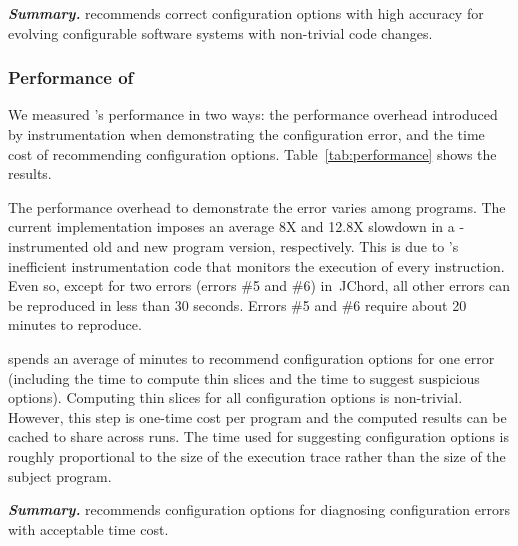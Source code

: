 


\vspace{1mm}

\noindent \textbf{\textit{Summary.}} \ourtool
recommends correct configuration options with
high accuracy for evolving configurable software systems
with non-trivial code changes.

\subsubsection{Performance of \ourtool}
\label{sec:timecost}

We measured \ourtool's performance in two ways:
the performance overhead introduced by instrumentation
when demonstrating the configuration error,
and the time cost of recommending configuration options.
Table~\ref{tab:performance} shows the results.

The performance overhead to demonstrate the error
varies among programs. The current implementation
imposes an average 8X and 12.8X slowdown in a
\ourtool-instrumented old and new program version, respectively.
This is due to \ourtool's inefficient instrumentation code that
monitors the execution of every instruction.
Even so, except for two errors (errors \#5 and \#6) in\
JChord,  all other errors can
be reproduced in less than 30 seconds. Errors \#5 and \#6
require about 20 minutes to reproduce.



\ourtool spends an average of \avgtime minutes
to recommend configuration options for one
error (including the time to compute thin slices
and the time to suggest suspicious options). 
Computing thin slices for all configuration options
is non-trivial. However, this step is one-time cost
per program and the computed results can
be cached to share across runs. 
The time used for suggesting configuration options
is roughly proportional to the size of the execution trace
rather than the size of the subject program.

\vspace{1mm}
\noindent \textbf{\textit{Summary.}} \ourtool
recommends configuration options for diagnosing
configuration errors with acceptable time cost.

